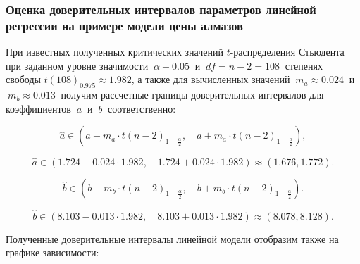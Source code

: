 \documentclass[
]{article}
\begin{document}
\hypertarget{ux43eux446ux435ux43dux43aux430-ux434ux43eux432ux435ux440ux438ux442ux435ux43bux44cux43dux44bux445-ux438ux43dux442ux435ux440ux432ux430ux43bux43eux432-ux43fux430ux440ux430ux43cux435ux442ux440ux43eux432-ux43bux438ux43dux435ux439ux43dux43eux439-ux440ux435ux433ux440ux435ux441ux441ux438ux438-ux43dux430-ux43fux440ux438ux43cux435ux440ux435-ux43cux43eux434ux435ux43bux438-ux446ux435ux43dux44b-ux430ux43bux43cux430ux437ux43eux432}{%
\subsubsection{\texorpdfstring{\textbf{Оценка доверительных интервалов
параметров линейной регрессии на примере модели цены
алмазов}}{Оценка доверительных интервалов параметров линейной регрессии на примере модели цены алмазов}}\label{ux43eux446ux435ux43dux43aux430-ux434ux43eux432ux435ux440ux438ux442ux435ux43bux44cux43dux44bux445-ux438ux43dux442ux435ux440ux432ux430ux43bux43eux432-ux43fux430ux440ux430ux43cux435ux442ux440ux43eux432-ux43bux438ux43dux435ux439ux43dux43eux439-ux440ux435ux433ux440ux435ux441ux441ux438ux438-ux43dux430-ux43fux440ux438ux43cux435ux440ux435-ux43cux43eux434ux435ux43bux438-ux446ux435ux43dux44b-ux430ux43bux43cux430ux437ux43eux432}}

При известных полученных критических значений \(t\)-распределения
Стьюдента при заданном уровне значимости \(\ \alpha - 0.05\ \) и
\(\ df = n - 2 = 108\ \) степенях свободы
\(t(108)_{0.975} \approx 1.982\), а также для вычисленных значений
\(\ m_a \approx 0.024\ \) и \(\ m_b \approx 0.013\ \) получим рассчетные
границы доверительных интервалов для коэффициентов \(\ a\ \) и \(\ b\ \)
соответственно:

\[
\hat{a} \in \left(a - m_a \cdot t(n-2)_{1 - \frac{\alpha}{2}}, \quad a + m_a \cdot t(n-2)_{1 - \frac{\alpha}{2}} \right),
\]

\[
\hat{a} \in \left(1.724 - 0.024 \cdot 1.982, \quad 1.724 + 0.024 \cdot 1.982 \right) \approx \left(1.676, 1.772 \right).
\]

\[
\hat{b} \in \left(b - m_b \cdot t(n-2)_{1 - \frac{\alpha}{2}}, \quad b + m_b \cdot t(n-2)_{1 - \frac{\alpha}{2}} \right).
\]

\[
\hat{b} \in \left(8.103 - 0.013 \cdot 1.982, \quad 8.103 + 0.013 \cdot 1.982 \right) \approx (8.078, 8.128).
\]

Полученные доверительные интервалы линейной модели отобразим также на
графике зависимости:

\(\ \)
\end{document}
